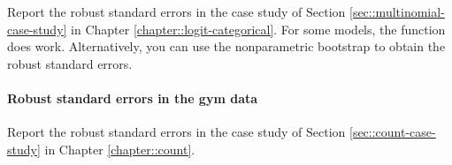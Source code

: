 Report the robust standard errors in the case study of Section \ref{sec::multinomial-case-study} in Chapter \ref{chapter::logit-categorical}. For some models, the function  does work. Alternatively, you can use the nonparametric bootstrap to obtain the robust standard errors. 



\paragraph{Robust standard errors in the gym data}

Report the robust standard errors in the case study of Section \ref{sec::count-case-study} in Chapter \ref{chapter::count}. 



 
